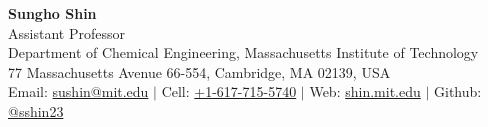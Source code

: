 \begin{center}
  {\bf\Large Sungho Shin}\\[.25em]
  Assistant Professor\\
Department of Chemical Engineering, Massachusetts Institute of Technology
\\
  77 Massachusetts Avenue 66-554, Cambridge, MA 02139, USA
\\
  Email: \href{mailto:sushin@mit.edu}{sushin@mit.edu} $|$ Cell: \href{tel:6177155740}{+1-617-715-5740} $|$ Web: \href{https://shin.mit.edu}{shin.mit.edu} $|$ Github: \href{https://github.com/sshin23}{@sshin23} 
\end{center}
